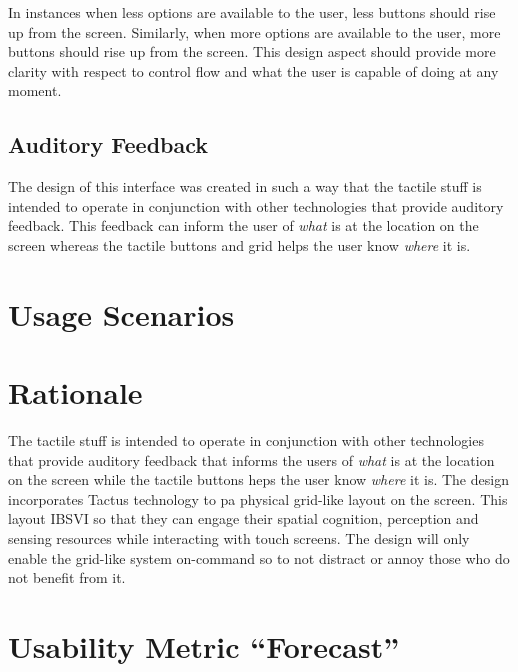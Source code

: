 \documentclass[11pt]{article}
\begin{document}
In instances when less options are available to the user, less buttons should rise up from the screen. Similarly, when more options are available to the user, more buttons should rise up from the screen. This design aspect should provide more clarity with respect to control flow and what the user is capable of doing at any moment.

\subsection{Auditory Feedback}
The design of this interface was created in such a way that the tactile stuff is intended to operate in conjunction with other technologies that provide auditory feedback. This feedback can inform the user of \textit{what} is at the location on the screen whereas the tactile buttons and grid helps the user know \textit{where} it is.


\section{Usage Scenarios}

\section{Rationale}
The tactile stuff is intended to operate in conjunction with other technologies that provide auditory feedback that informs the users of \textit{what} is at the location on the screen while the tactile buttons heps the user know \textit{where} it is. 
The design incorporates Tactus technology to pa physical grid-like layout on the screen. This layout IBSVI so that they can engage their spatial cognition, perception and sensing resources while interacting with touch screens. The design will only enable the grid-like system on-command so to not distract or annoy those who do not benefit from it.

\section{Usability Metric ``Forecast''}
\clearpage


{}

\end{document}
